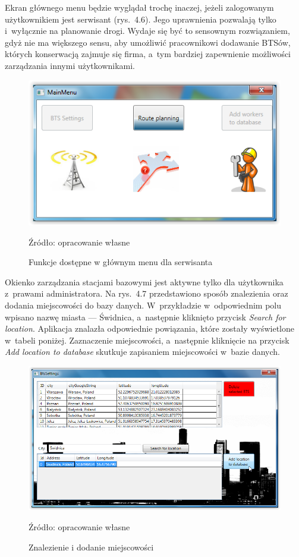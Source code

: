 \documentclass[12pt,a4paper]{report}
\begin{document}
Ekran głównego menu będzie wyglądał trochę inaczej, jeżeli zalogowanym użytkownikiem jest serwisant (rys.~4.6). Jego uprawnienia pozwalają tylko i~wyłącznie na planowanie drogi. Wydaje się być to sensownym rozwiązaniem, gdyż nie ma większego sensu, aby umożliwić pracownikowi dodawanie BTSów, których konserwacją zajmuje się firma, a~tym bardziej zapewnienie możliwości zarządzania innymi użytkownikami.

\begin{figure}[!bht]
\centering
\includegraphics[scale=1]{Pictures/MainMenuUser.png}
\label{fig: MainMenuUser}
\caption{Funkcje dostępne w głównym menu dla serwisanta}{Źródło: opracowanie własne}
\end{figure}
\newpage
Okienko zarządzania stacjami bazowymi jest aktywne tylko dla użytkownika z~prawami administratora. Na rys.~4.7 przedstawiono sposób znalezienia oraz dodania miejscowości do bazy danych. W~przykładzie w~odpowiednim polu wpisano nazwę miasta --- Świdnica, a~następnie kliknięto przycisk \textit{Search for location}. Aplikacja znalazła odpowiednie powiązania, które zostały wyświetlone w~tabeli poniżej. Zaznaczenie miejscowości, a~następnie kliknięcie na przycisk \textit{Add location to database} skutkuje zapisaniem miejscowości w~bazie danych. 

\begin{figure}[!bht]
\centering
\includegraphics[scale=0.5]{Pictures/AddBTS.png}
\label{fig: AddBTS}
\caption{Znalezienie i dodanie miejscowości}{Źródło: opracowanie własne}
\end{figure}
\end{document}
